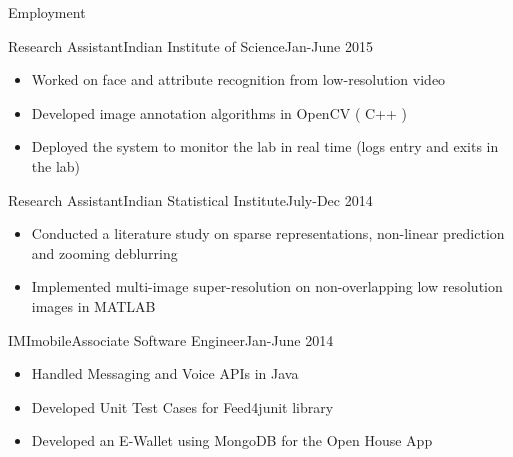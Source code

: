 \documentclass[]{mcdowellcv}
\begin{document}
	\vspace{-.3cm}

	\begin{cvsection}{Employment}
        
        \vspace{.2cm}
        
        \begin{cvsubsection}{Research Assistant}{Indian Institute of Science}{Jan-June 2015}
			
            \vspace{-.2cm}
            
            \begin{itemize}
				\item Worked on face and attribute recognition from low-resolution video
                \item Developed image annotation algorithms in OpenCV ( C++ )
                \item Deployed the system to monitor the lab in real time (logs entry and exits in the lab)
			\end{itemize}
		\end{cvsubsection}
		
		\begin{cvsubsection}{Research Assistant}{Indian Statistical Institute}{July-Dec 2014}	
			
            \vspace{-.2cm}
            
            \begin{itemize}
				\item Conducted a literature study on sparse representations, non-linear prediction and zooming deblurring
                \item Implemented multi-image super-resolution on non-overlapping low resolution images in MATLAB
			\end{itemize}
		\end{cvsubsection}
		
		\begin{cvsubsection}{IMImobile}{Associate Software Engineer}{Jan-June 2014}		
			
            \vspace{-.2cm}
            
            \begin{itemize}
				\item Handled Messaging and Voice APIs in Java
                \item Developed Unit Test Cases for Feed4junit library
				\item Developed an E-Wallet using MongoDB for the Open House App
			\end{itemize}
		\end{cvsubsection}
		
	\end{cvsection}
	
\end{document}
